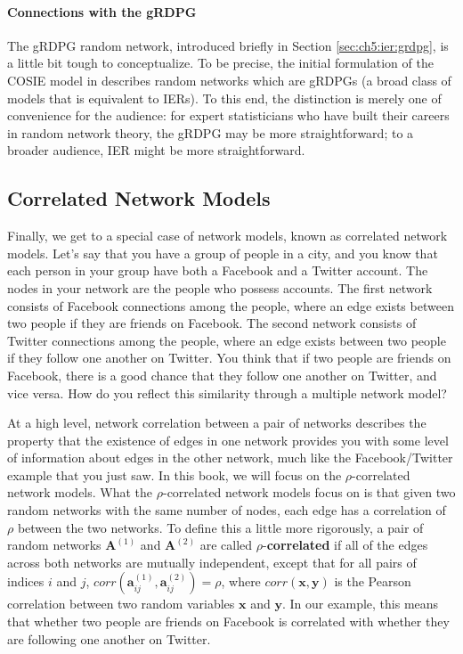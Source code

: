 \paragraph{Connections with the gRDPG}

The gRDPG random network, introduced briefly in Section \ref{sec:ch5:ier:grdpg}, is a little bit tough to conceptualize. To be precise, the initial formulation of the COSIE model in \cite{Arroyo2021} describes random networks which are gRDPGs (a broad class of models that is equivalent to IERs). To this end, the distinction is merely one of convenience for the audience: for expert statisticians who have built their careers in random network theory, the gRDPG may be more straightforward; to a broader audience, IER might be more straightforward. 

\subsection{Correlated Network Models}
\label{sec:ch5:multi:corr}

Finally, we get to a special case of network models, known as correlated network models. Let's say that you have a group of people in a city, and you know that each person in your group have both a Facebook and a Twitter account. The nodes in your network are the people who possess accounts. The first network consists of Facebook connections among the people, where an edge exists between two people if they are friends on Facebook. The second network consists of Twitter connections among the people, where an edge exists between two people if they follow one another on Twitter. You think that if two people are friends on Facebook, there is a good chance that they follow one another on Twitter, and vice versa. How do you reflect this similarity through a multiple network model?

At a high level, network correlation between a pair of networks describes the property that the existence of edges in one network provides you with some level of information about edges in the other network, much like the Facebook/Twitter example that you just saw. In this book, we will focus on the $\rho$-{correlated} network models. What the $\rho$-correlated network models focus on is that given two random networks with the same number of nodes, each edge has a correlation of $\rho$ between the two networks. To define this a little more rigorously, a pair of random networks $\mathbf A^{(1)}$ and $\mathbf A^{(2)}$ are called $\rho$-\textbf{correlated} if all of the edges across both networks are mutually independent, except that for all pairs of indices $i$ and $j$, $corr(\mathbf a_{ij}^{(1)}, \mathbf a_{ij}^{(2)}) = \rho$, where $corr(\mathbf x, \mathbf y)$ is the Pearson correlation between two random variables $\mathbf x$ and $\mathbf y$. In our example, this means that whether two people are friends on Facebook is {correlated} with whether they are following one another on Twitter.

